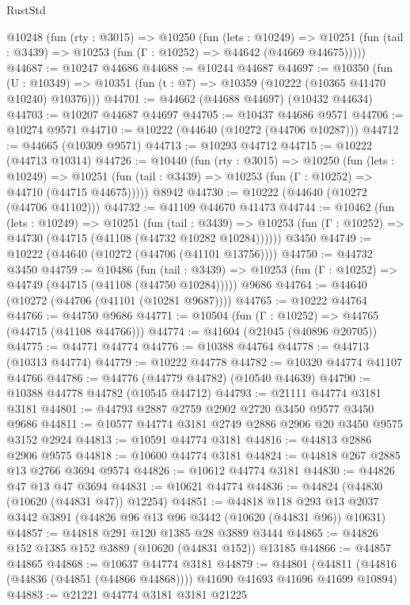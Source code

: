 \begin{lexlean}{RustStd}
\begin{coremodule}
  @10248
    (fun (rty : @3015) =>
    @10250
      (fun (lets : @10249) =>
      @10251 (fun (tail : @3439) => @10253 (fun (Γ : @10252) => @44642 (@44669 @44675)))))
@44687 := @10247 @44686
@44688 := @10244 @44687
@44697 := @10350
    (fun (U : @10349) => @10351 (fun (t : @7) => @10359 (@10222 (@10365 @41470 @10240) @10376)))
@44701 := @44662 (@44688 @44697) (@10432 @44634)
@44703 := @10207 @44687 @44697
@44705 := @10437 @44686 @9571
@44706 := @10274 @9571
@44710 := @10222 (@44640 (@10272 (@44706 @10287)))
@44712 := @44665 (@10309 @9571)
@44713 := @10293 @44712
@44715 := @10222 (@44713 @10314)
@44726 := @10440
    (fun (rty : @3015) =>
    @10250
      (fun (lets : @10249) =>
      @10251 (fun (tail : @3439) => @10253 (fun (Γ : @10252) => @44710 (@44715 @44675)))))
    @8942
@44730 := @10222 (@44640 (@10272 (@44706 @41102)))
@44732 := @41109 @44670 @41473
@44744 := @10462
    (fun (lets : @10249) =>
    @10251
      (fun (tail : @3439) =>
      @10253 (fun (Γ : @10252) => @44730 (@44715 (@41108 (@44732 @10282 @10284))))))
    @3450
@44749 := @10222 (@44640 (@10272 (@44706 (@41101 @13756))))
@44750 := @44732 @3450
@44759 := @10486
    (fun (tail : @3439) => @10253 (fun (Γ : @10252) => @44749 (@44715 (@41108 (@44750 @10284)))))
    @9686
@44764 := @44640 (@10272 (@44706 (@41101 (@10281 @9687))))
@44765 := @10222 @44764
@44766 := @44750 @9686
@44771 := @10504 (fun (Γ : @10252) => @44765 (@44715 (@41108 @44766)))
@44774 := @41604 (@21045 (@40896 @20705))
@44775 := @44771 @44774
@44776 := @10388 @44764
@44778 := @44713 (@10313 @44774)
@44779 := @10222 @44778
@44782 := @10320 @44774 @41107 @44766
@44786 := @44776 (@44779 @44782) (@10540 @44639)
@44790 := @10388 @44778 @44782 (@10545 @44712)
@44793 := @21111 @44774 @3181 @3181
@44801 := @44793 @2887 @2759 @2902 @2720 @3450 @9577 @3450 @9686
@44811 := @10577 @44774 @3181 @2749 @2886 @2906 @20 @3450 @9575 @3152 @2924
@44813 := @10591 @44774 @3181
@44816 := @44813 @2886 @2906 @9575
@44818 := @10600 @44774 @3181
@44824 := @44818 @267 @2885 @13 @2766 @3694 @9574
@44826 := @10612 @44774 @3181
@44830 := @44826 @47 @13 @47 @3694
@44831 := @10621 @44774
@44836 := @44824 (@44830 (@10620 (@44831 @47)) @12254)
@44851 := @44818
    @118
    @293
    @13
    @2037
    @3442
    @3891
    (@44826 @96 @13 @96 @3442 (@10620 (@44831 @96)) @10631)
@44857 := @44818 @291 @120 @1385 @28 @3889 @3444
@44865 := @44826 @152 @1385 @152 @3889 (@10620 (@44831 @152)) @13185
@44866 := @44857 @44865
@44868 := @10637 @44774 @3181
@44879 := @44801
    (@44811 (@44816 (@44836 (@44851 (@44866 @44868)))) @41690 @41693 @41696 @41699 @10894)
@44883 := @21221 @44774 @3181 @3181 @21225

\end{coremodule}
\end{lexlean}
